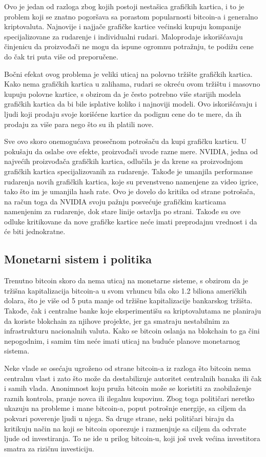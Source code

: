 \documentclass[a4paper]{article}
\begin{document}
{Ovo je jedan od razloga zbog kojih postoji nestašica grafičkih kartica, i to je problem koji se znatno pogoršava sa porastom popularnosti bitcoin-a i generalno kriptovaluta. Najnovije i najjače grafičke kartice većinski kupuju kompanije specijalizovane za rudarenje i individualni rudari. Maloprodaje iskorišćavaju činjenicu da proizvođači ne mogu da ispune ogromnu potražnju, te podižu cene do čak tri puta više od preporučene.

Bočni efekat ovog problema je veliki uticaj na polovno tržište grafičkih kartica. Kako nema grafičkih kartica u zalihama, rudari se okreću ovom tržištu i masovno kupuju polovne kartice, s obzirom da je često potrebno više starijih modela grafičkih kartica da bi bile isplative koliko i najnoviji modeli. Ovo iskorišćavaju i ljudi koji prodaju svoje korišćene kartice da podignu cene do te mere, da ih prodaju za više para nego što su ih platili nove.

Sve ovo skoro onemogućava prosečnom potrošaču da kupi grafičku karticu. U pokušaju da oslabe ove efekte, proizvođači uvode razne mere. NVIDIA, jedna od najvećih proizvođača grafičkih kartica, odlučila je da krene sa proizvodnjom grafičkih kartica specijalizovanih za rudarenje. Takođe je umanjila performanse rudarenja novih grafičkih kartica, koje su prvenstveno namenjene za video igrice, tako što im je umanjila hash rate. Ovo je dovelo do kritika od strane potrošača, na račun toga da NVIDIA svoju pažnju posvećuje grafičkim karticama namenjenim za rudarenje, dok stare linije ostavlja po strani. Takođe su ove odluke kritikovane da nove grafičke kartice neće imati preprodajnu vrednost i da će biti jednokratne.

\subsection{Monetarni sistem i politika}

Trenutno bitcoin skoro da nema uticaj na monetarne sisteme, s obzirom da je tržišna kapitalizacija bitcoin-a u svom vrhuncu bila oko 1.2 biliona američkih dolara, što je više od 5 puta manje od tržišne kapitalizacije bankarskog tržišta. Takođe, čak i centralne banke koje eksperimentišu sa kriptovalutama ne planiraju da koriste blokchain za njihove projekte, jer ga smatraju nestabilnim za infrastrukturu nacionalnih valuta. Kako se bitcoin oslanja na blokchain to ga čini nepogodnim, i samim tim neće imati uticaj na buduće planove monetarnog sistema.

Neke vlade se osećaju ugroženo od strane bitcoin-a iz razloga što bitcoin nema centralnu vlast i zato što može da destabilizuje autoritet centralnih banaka ili čak i samih vlada. Anonimnost koju pruža bitcoin može se koristiti za zaobilaženje raznih kontrola, pranje novca ili ilegalnu kupovinu. Zbog toga političari neretko ukazuju na probleme i mane bitcoin-a, poput potrošnje energije, sa ciljem da pokvari poverenje ljudi u njega. Sa druge strane, neki političari biraju da kritikuju način na koji se bitcoin oporezuje i razmenjuje sa ciljem da odvrate ljude od investiranja. To ne ide u prilog bitcoin-u, koji još uvek većina investitora smatra za rizičnu investiciju.


}
\end{document}

